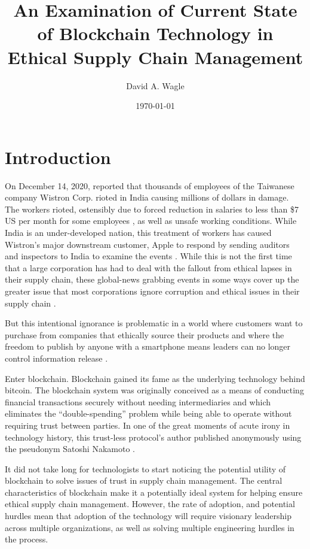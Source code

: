\documentclass[man]{apa7}
\affiliation{North Central University}
\author{David A. Wagle}
\date{\today}
\title{An Examination of Current State of Blockchain Technology in Ethical Supply Chain Management}
\begin{document}
\maketitle


\section{Introduction}
\label{sec:org938be51}

On December 14, 2020, \textcite{reutersAppleProbesViolence2020} reported that
thousands of employees of the Taiwanese company Wistron Corp. rioted in India
causing millions of dollars in damage. The workers rioted, ostensibly due to
forced reduction in salaries to less than \$7 US per month for some employees
\parencite{amadeoIPhoneFactoryWorkers2020}, as well as unsafe working conditions. While
India is an under-developed nation, this treatment of workers has caused
Wistron's major downstream customer, Apple to respond by sending auditors and
inspectors to India to examine the events
\parencite{reutersAppleSupplierPuts2020}. While this is not the first time that a
large corporation has had to deal with the fallout from ethical lapses in their
supply chain, these global-news grabbing events in some ways cover up the
greater issue that most corporations ignore corruption and ethical issues in
their supply chain \parencite{webbTwoThirdsCorporationsIgnore2017}.

But this intentional ignorance is problematic in a world where customers want to
purchase from companies that ethically source their products
\parencite{howellsSAPBrandVoiceEthics2020} and where the freedom to publish by anyone with
a smartphone means leaders can no longer control information release
\parencite{davenportGoogleHowTechnology2014}.

Enter blockchain. Blockchain gained its fame as the underlying technology behind
bitcoin. The blockchain system was originally conceived as a means of conducting
financial transactions securely without needing intermediaries and which
eliminates the ``double-spending'' problem while being able to operate without
requiring trust between parties. In one of the great moments of acute irony
in technology history, this trust-less protocol's author published anonymously
using the pseudonym Satoshi Nakamoto
\citeyear{nakamotoBitcoinPeertoPeerElectronic2008}. 

It did not take long for technologists to start noticing the potential utility
of blockchain to solve issues of trust in supply chain management. The central
characteristics of blockchain make it a potentially ideal system for helping
ensure ethical supply chain management. However, the rate of adoption, and
potential hurdles mean that adoption of the technology will require visionary
leadership across multiple organizations, as well as solving multiple
engineering hurdles in the process. 
\end{document}
